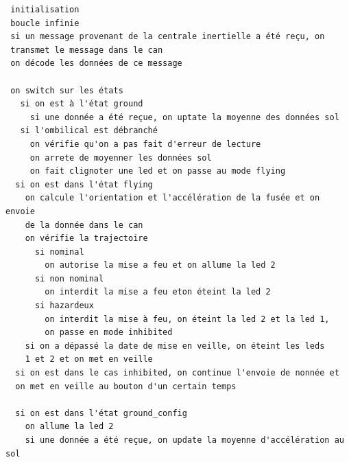 \documentclass{article}
\begin{document}
\begin{verbatim}
 initialisation
 boucle infinie
 si un message provenant de la centrale inertielle a été reçu, on 
 transmet le message dans le can
 on décode les données de ce message
 
 on switch sur les états
   si on est à l'état ground
     si une donnée a été reçue, on uptate la moyenne des données sol
   si l'ombilical est débranché
     on vérifie qu'on a pas fait d'erreur de lecture
     on arrete de moyenner les données sol
     on fait clignoter une led et on passe au mode flying
  si on est dans l'état flying
    on calcule l'orientation et l'accélération de la fusée et on envoie 
    de la donnée dans le can
    on vérifie la trajectoire
      si nominal
        on autorise la mise a feu et on allume la led 2
      si non nominal
        on interdit la mise a feu eton éteint la led 2
      si hazardeux
        on interdit la mise à feu, on éteint la led 2 et la led 1, 
        on passe en mode inhibited
    si on a dépassé la date de mise en veille, on éteint les leds 
    1 et 2 et on met en veille
  si on est dans le cas inhibited, on continue l'envoie de nonnée et 
  on met en veille au bouton d'un certain temps
  
  si on est dans l'état ground_config
    on allume la led 2
    si une donnée a été reçue, on update la moyenne d'accélération au sol
  
  
\end{verbatim}
\end{document}
